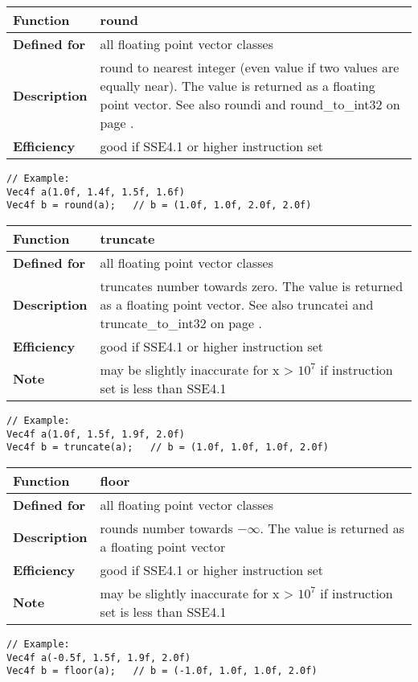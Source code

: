 \documentclass[vcl_manual.tex]{subfiles}
\begin{document}
\begin{tabular}{|p{25mm}|p{100mm}|}
\hline
\bfseries Function & round \\ \hline
\bfseries Defined for & all floating point vector classes \\ \hline
\bfseries Description & round to nearest integer (even value if two values are equally near). The value is returned as a floating point vector.\newline
See also roundi and round\_to\_int32 on page \pageref{roundToInt}. \\ \hline
\bfseries Efficiency & good if SSE4.1 or higher instruction set \\ \hline
\end{tabular}
\begin{lstlisting}[frame=none]
// Example:
Vec4f a(1.0f, 1.4f, 1.5f, 1.6f)
Vec4f b = round(a);   // b = (1.0f, 1.0f, 2.0f, 2.0f)
\end{lstlisting}


\begin{tabular}{|p{25mm}|p{100mm}|}
\hline
\bfseries Function & truncate \\ \hline
\bfseries Defined for & all floating point vector classes \\ \hline
\bfseries Description & truncates number towards zero. The value is returned as a floating point vector. \newline
See also truncatei and truncate\_to\_int32 on page \pageref{truncateToInt}. \\ \hline
\bfseries Efficiency & good if SSE4.1 or higher instruction set \\ \hline
\bfseries Note & may be slightly inaccurate for x \textgreater{} $10^7$ if instruction set is less than SSE4.1 \\ \hline
\end{tabular}
\begin{lstlisting}[frame=none]
// Example:
Vec4f a(1.0f, 1.5f, 1.9f, 2.0f)
Vec4f b = truncate(a);   // b = (1.0f, 1.0f, 1.0f, 2.0f)
\end{lstlisting}


\begin{tabular}{|p{25mm}|p{100mm}|}
\hline
\bfseries Function & floor \\ \hline
\bfseries Defined for & all floating point vector classes \\ \hline
\bfseries Description & rounds number towards $-\infty$. The value is returned as a floating point vector \\ \hline
\bfseries Efficiency & good if SSE4.1 or higher instruction set \\ \hline
\bfseries Note & may be slightly inaccurate for x \textgreater{} $10^7$ if instruction set is less than SSE4.1 \\ \hline
\end{tabular}
\begin{lstlisting}[frame=none]
// Example:
Vec4f a(-0.5f, 1.5f, 1.9f, 2.0f)
Vec4f b = floor(a);   // b = (-1.0f, 1.0f, 1.0f, 2.0f)
\end{lstlisting}
\end{document}
